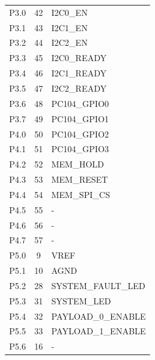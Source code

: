 \begin{table}[!h]
\begin{tabular}{lcl}
        \midrule
        P3.0              & 42                  & I2C0\_EN              \\
        P3.1              & 43                  & I2C1\_EN              \\
        P3.2              & 44                  & I2C2\_EN              \\
        P3.3              & 45                  & I2C0\_READY           \\
        P3.4              & 46                  & I2C1\_READY           \\
        P3.5              & 47                  & I2C2\_READY           \\
        P3.6              & 48                  & PC104\_GPIO0          \\
        P3.7              & 49                  & PC104\_GPIO1          \\
        \midrule
        P4.0              & 50                  & PC104\_GPIO2          \\
        P4.1              & 51                  & PC104\_GPIO3          \\
        P4.2              & 52                  & MEM\_HOLD             \\
        P4.3              & 53                  & MEM\_RESET            \\
        P4.4              & 54                  & MEM\_SPI\_CS          \\
        P4.5              & 55                  & -                     \\
        P4.6              & 56                  & -                     \\
        P4.7              & 57                  & -                     \\
        \midrule
        P5.0              & 9                   & VREF                  \\
        P5.1              & 10                  & AGND                  \\
        P5.2              & 28                  & SYSTEM\_FAULT\_LED    \\
        P5.3              & 31                  & SYSTEM\_LED           \\
        P5.4              & 32                  & PAYLOAD\_0\_ENABLE    \\
        P5.5              & 33                  & PAYLOAD\_1\_ENABLE    \\
        P5.6              & 16                  & -                     \\

\end{tabular}
\end{table}
